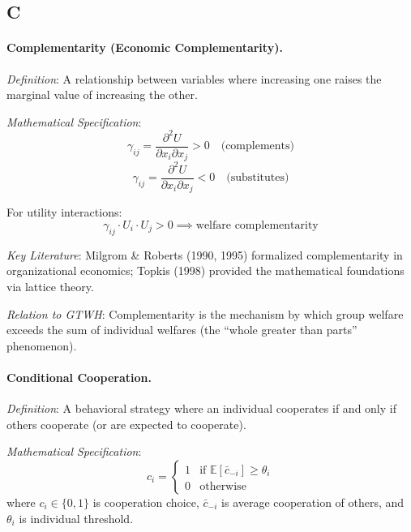\documentclass[12pt,a4paper]{article}
\begin{document}
\subsection*{C}

\paragraph{Complementarity (Economic Complementarity).}
\textit{Definition}: A relationship between variables where increasing one raises 
the marginal value of increasing the other.

\textit{Mathematical Specification}:
\begin{equation}
\gamma_{ij} = \frac{\partial^2 U}{\partial x_i \partial x_j} > 0 \quad \text{(complements)}
\end{equation}
\begin{equation}
\gamma_{ij} = \frac{\partial^2 U}{\partial x_i \partial x_j} < 0 \quad \text{(substitutes)}
\end{equation}

For utility interactions:
\begin{equation}
\gamma_{ij} \cdot U_i \cdot U_j > 0 \implies \text{welfare complementarity}
\end{equation}

\textit{Key Literature}: Milgrom \& Roberts (1990, 1995) formalized complementarity 
in organizational economics; Topkis (1998) provided the mathematical foundations 
via lattice theory.

\textit{Relation to GTWH}: Complementarity is the mechanism by which group welfare 
exceeds the sum of individual welfares (the ``whole greater than parts'' phenomenon).

\medskip

\paragraph{Conditional Cooperation.}
\textit{Definition}: A behavioral strategy where an individual cooperates if and 
only if others cooperate (or are expected to cooperate).

\textit{Mathematical Specification}:
\begin{equation}
c_i = \begin{cases}
1 & \text{if } \mathbb{E}[\bar{c}_{-i}] \geq \theta_i \\
0 & \text{otherwise}
\end{cases}
\end{equation}
where $c_i \in \{0,1\}$ is cooperation choice, $\bar{c}_{-i}$ is average cooperation 
of others, and $\theta_i$ is individual threshold.
\end{document}
